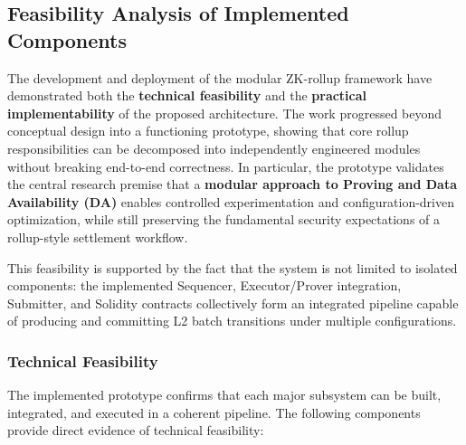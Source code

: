 \subsection{Feasibility Analysis of Implemented Components}
\vspace{12pt}

The development and deployment of the modular ZK-rollup framework have demonstrated both the \textbf{technical feasibility} and the \textbf{practical implementability} of the proposed architecture. The work progressed beyond conceptual design into a functioning prototype, showing that core rollup responsibilities can be decomposed into independently engineered modules without breaking end-to-end correctness. In particular, the prototype validates the central research premise that a \textbf{modular approach to Proving and Data Availability (DA)} enables controlled experimentation and configuration-driven optimization, while still preserving the fundamental security expectations of a rollup-style settlement workflow.

This feasibility is supported by the fact that the system is not limited to isolated components: the implemented Sequencer, Executor/Prover integration, Submitter, and Solidity contracts collectively form an integrated pipeline capable of producing and committing L2 batch transitions under multiple configurations.

\subsubsection{Technical Feasibility}
\vspace{12pt}

The implemented prototype confirms that each major subsystem can be built, integrated, and executed in a coherent pipeline. The following components provide direct evidence of technical feasibility:

